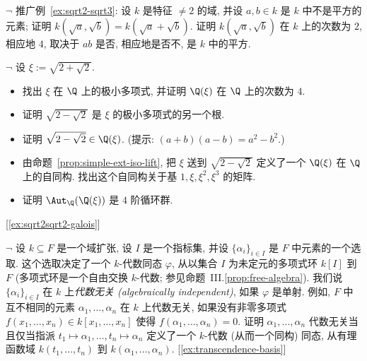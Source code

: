 \begin{prob}\label{ex:sqrta-sqrtb}
$\neg$ 推广例~\ref{ex:sqrt2-sqrt3}: 设 $k$ 是特征 $\neq 2$ 的域, 并设 $a,b\in k$ 是 $k$ 中不是平方的元素; 证明 $k(\sqrt{a},\sqrt{b})=k(\sqrt{a}+\sqrt{b})$.
证明 $k(\sqrt{a},\sqrt{b})$ 在 $k$ 上的次数为 $2$, 相应地 $4$, 取决于 $ab$ 是否, 相应地是否不, 是 $k$ 中的平方.
\end{prob}

\begin{prob}\label{ex:xi-sqrt2-sqrt2}
$\neg$ 设 $\xi:=\sqrt{2+\sqrt{2}}$.

\begin{itemize}
\item 找出 $\xi$ 在 $\Q$ 上的极小多项式, 并证明 $\Q(\xi)$ 在 $\Q$ 上的次数为 $4$.
\item 证明 $\sqrt{2-\sqrt{2}}$ 是 $\xi$ 的极小多项式的另一个根.
\item 证明 $\sqrt{2-\sqrt{2}}\in\Q(\xi)$. (提示: $(a+b)(a-b)=a^2-b^2$.)
\item 由命题~\ref{prop:simple-ext-iso-lift}, 把 $\xi$ 送到 $\sqrt{2-\sqrt{2}}$ 定义了一个 $\Q(\xi)$ 在 $\Q$ 上的自同构. 找出这个自同构关于基 $1,\xi,\xi^2,\xi^3$ 的矩阵.
\item 证明 $\Aut_{\Q}(\Q(\xi))$ 是 $4$ 阶循环群.
\end{itemize}
[\ref{ex:sqrt2sqrt2-galois}]
\end{prob}

\begin{prob}\label{ex:algebraic-independent}
$\neg$ 设 $k\subseteq F$ 是一个域扩张, 设 $I$ 是一个指标集, 并设 $\{\alpha_i\}_{i\in I}$ 是 $F$ 中元素的一个选取. 这个选取决定了一个 $k$-代数同态 $\varphi$, 从以集合 $I$ 为未定元的多项式环 $k[I]$ 到 $F$ (多项式环是一个自由交换 $k$-代数; 参见命题~III.\ref{prop:free-algebra}). 我们说 $\{\alpha_i\}_{i\in I}$ 在 $k$ 上\emph{代数无关 (algebraically independent)}, 如果 $\varphi$ 是单射. 例如, $F$ 中互不相同的元素 $\alpha_1,\ldots,\alpha_n$ 在 $k$ 上代数无关, 如果没有非零多项式 $f(x_1,\ldots,x_n)\in k[x_1,\ldots,x_n]$ 使得 $f(\alpha_1,\ldots,\alpha_n)=0$.
证明 $\alpha_1,\ldots,\alpha_n$ 代数无关当且仅当指派 $t_1\mapsto\alpha_1,\dots,t_n\mapsto\alpha_n$ 定义了一个 $k$-代数 (从而一个同构) 同态, 从有理函数域 $k(t_1,\ldots,t_n)$ 到 $k(\alpha_1,\ldots,\alpha_n)$. [\ref{ex:transcendence-basis}]
\end{prob}


